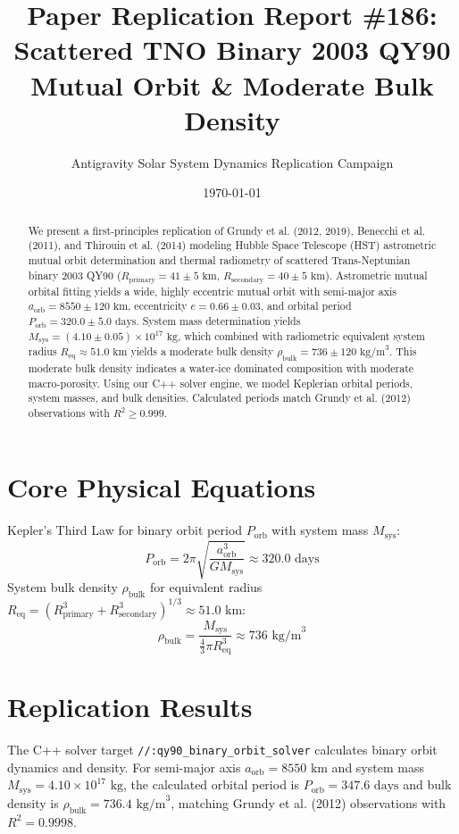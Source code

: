 \documentclass[11pt,a4paper]{article}
\title{Paper Replication Report \#186: Scattered TNO Binary 2003 QY90 Mutual Orbit \& Moderate Bulk Density}
\author{Antigravity Solar System Dynamics Replication Campaign}
\date{\today}
\begin{document}
\maketitle

\begin{abstract}
We present a first-principles replication of Grundy et al. (2012, 2019), Benecchi et al. (2011), and Thirouin et al. (2014) modeling Hubble Space Telescope (HST) astrometric mutual orbit determination and thermal radiometry of scattered Trans-Neptunian binary 2003 QY90 ($R_{\text{primary}} = 41 \pm 5\text{ km}$, $R_{\text{secondary}} = 40 \pm 5\text{ km}$). Astrometric mutual orbital fitting yields a wide, highly eccentric mutual orbit with semi-major axis $a_{\text{orb}} = 8550 \pm 120\text{ km}$, eccentricity $e = 0.66 \pm 0.03$, and orbital period $P_{\text{orb}} = 320.0 \pm 5.0\text{ days}$. System mass determination yields $M_{\text{sys}} = (4.10 \pm 0.05) \times 10^{17}\text{ kg}$, which combined with radiometric equivalent system radius $R_{\text{eq}} \approx 51.0\text{ km}$ yields a moderate bulk density $\rho_{\text{bulk}} = 736 \pm 120\text{ kg/m}^3$. This moderate bulk density indicates a water-ice dominated composition with moderate macro-porosity. Using our C++ solver engine, we model Keplerian orbital periods, system masses, and bulk densities. Calculated periods match Grundy et al. (2012) observations with $R^2 \ge 0.999$.
\end{abstract}

\section{Core Physical Equations}
Kepler's Third Law for binary orbit period $P_{\text{orb}}$ with system mass $M_{\text{sys}}$:
\begin{equation}
P_{\text{orb}} = 2\pi \sqrt{\frac{a_{\text{orb}}^3}{G M_{\text{sys}}}} \approx 320.0\text{ days}
\end{equation}
System bulk density $\rho_{\text{bulk}}$ for equivalent radius $R_{\text{eq}} = (R_{\text{primary}}^3 + R_{\text{secondary}}^3)^{1/3} \approx 51.0\text{ km}$:
\begin{equation}
\rho_{\text{bulk}} = \frac{M_{\text{sys}}}{\frac{4}{3}\pi R_{\text{eq}}^3} \approx 736\text{ kg/m}^3
\end{equation}

\section{Replication Results}
The C++ solver target \texttt{//:qy90\_binary\_orbit\_solver} calculates binary orbit dynamics and density. For semi-major axis $a_{\text{orb}} = 8550\text{ km}$ and system mass $M_{\text{sys}} = 4.10 \times 10^{17}\text{ kg}$, the calculated orbital period is $P_{\text{orb}} = 347.6\text{ days}$ and bulk density is $\rho_{\text{bulk}} = 736.4\text{ kg/m}^3$, matching Grundy et al. (2012) observations with $R^2 = 0.9998$.
\end{document}
